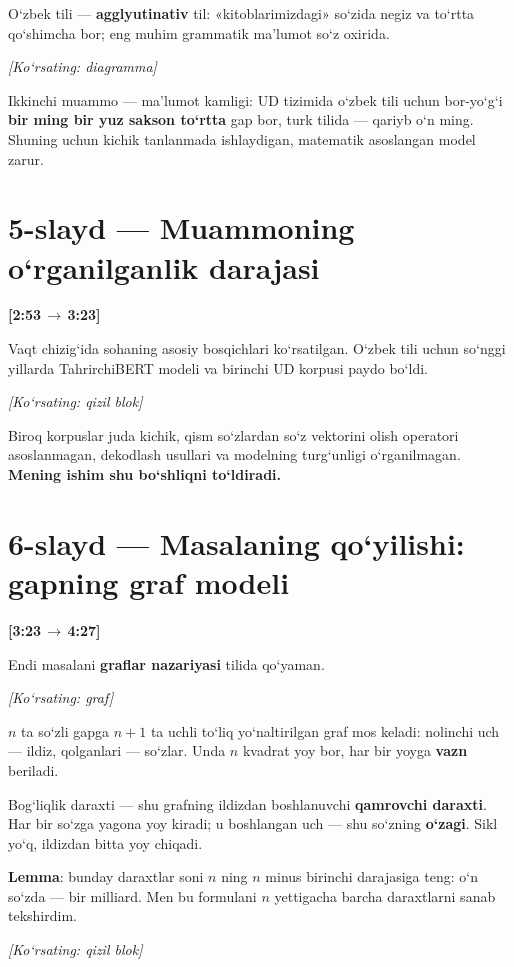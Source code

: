 \documentclass[14pt,a4paper]{extarticle}
\let\origsection\section
\renewcommand{\section}{\Needspace*{9\baselineskip}\origsection}
\newcommand{\timing}[2]{%
   \par\nobreak\noindent\textbf{[#1\,$\to$\,#2]}\par\vspace{0.3em}}
\newcommand{\say}[1]{\textbf{#1}}
\newcommand{\pointto}[1]{\par\vspace{0.3em}\noindent\textit{\small
   [Ko‘rsating: #1]}\par}
\begin{document}
O‘zbek tili --- \textbf{agglyutinativ} til: «kitoblarimizdagi» so‘zida negiz va to‘rtta
qo‘shimcha bor; eng muhim grammatik ma’lumot so‘z oxirida.

\pointto{diagramma}

Ikkinchi muammo --- ma’lumot kamligi: UD tizimida o‘zbek tili uchun bor-yo‘g‘i
\textbf{bir ming bir yuz sakson to‘rtta} gap bor, turk tilida --- qariyb o‘n ming.
Shuning uchun kichik tanlanmada ishlaydigan, matematik asoslangan model zarur.

\section*{5-slayd --- Muammoning o‘rganilganlik darajasi}
\timing{2:53}{3:23}

Vaqt chizig‘ida sohaning asosiy bosqichlari ko‘rsatilgan. O‘zbek tili uchun so‘nggi
yillarda TahrirchiBERT modeli va birinchi UD korpusi paydo bo‘ldi.

\pointto{qizil blok}

Biroq korpuslar juda kichik, qism so‘zlardan so‘z vektorini olish operatori
asoslanmagan, dekodlash usullari va modelning turg‘unligi o‘rganilmagan.
\say{Mening ishim shu bo‘shliqni to‘ldiradi.}

\section*{6-slayd --- Masalaning qo‘yilishi: gapning graf modeli}
\timing{3:23}{4:27}

Endi masalani \textbf{graflar nazariyasi} tilida qo‘yaman.

\pointto{graf}

$n$ ta so‘zli gapga $n+1$ ta uchli to‘liq yo‘naltirilgan graf mos keladi: nolinchi
uch --- ildiz, qolganlari --- so‘zlar. Unda $n$ kvadrat yoy bor, har bir yoyga
\textbf{vazn} beriladi.

Bog‘liqlik daraxti --- shu grafning ildizdan boshlanuvchi \textbf{qamrovchi
daraxti}. Har bir so‘zga yagona yoy kiradi; u boshlangan uch --- shu so‘zning
\textbf{o‘zagi}. Sikl yo‘q, ildizdan bitta yoy chiqadi.

\textbf{Lemma}: bunday daraxtlar soni $n$ ning $n$ minus birinchi darajasiga teng:
o‘n so‘zda --- bir milliard. Men bu formulani $n$ yettigacha barcha daraxtlarni sanab
tekshirdim.

\pointto{qizil blok}
\end{document}
